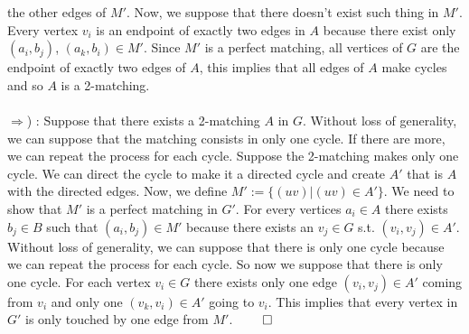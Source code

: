 \documentclass[a4paper,11pt,french]{article}
\begin{document}
 the other edges of $M'$. Now, we suppose that there doesn't exist such thing in $M'$. Every vertex $v_i$ is an endpoint of exactly two edges in $A$ because there exist only $(a_i,b_j)$, $(a_k,b_i) \in M'$. Since $M'$ is a perfect matching, all vertices of $G$ are the endpoint of exactly two edges of $A$, this implies that all edges of $A$ make cycles and so $A$ is a 2-matching.\\\\

$\Rightarrow$) : Suppose that there exists a 2-matching $A$ in $G$. Without loss of generality, we can suppose that the matching consists in only one cycle. If there are more, we can repeat the process for each cycle. Suppose the 2-matching makes only one cycle. We can direct the cycle to make it a directed cycle and create $A'$ that is $A$ with the directed edges. Now, we define $M' := \{ (uv) | (uv) \in A' \}$. We need to show that $M'$ is a perfect matching in $G'$. For every vertices $a_i\in A$ there exists $b_j\in B$ such that $(a_i,b_j) \in M'$ because there exists an $v_j \in G$ s.t. $(v_i,v_j) \in A'$. Without loss of generality, we can suppose that there is only one cycle because we can repeat the process for each cycle. So now we suppose that there is only one cycle. For each vertex $v_i \in G$ there exists only one edge $(v_i,v_j) \in A'$ coming from $v_i$ and only one $(v_k,v_i) \in A'$ going to $v_i$. This implies that every vertex in $G'$ is only touched by one edge from $M'$.
$\qed$



  
\end{document}
